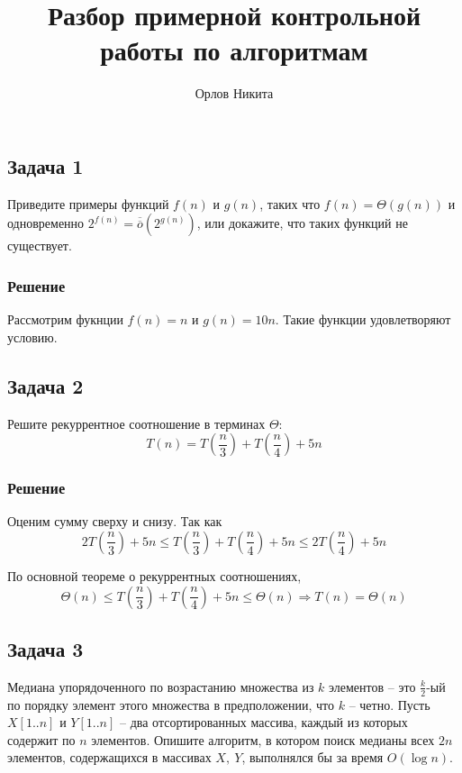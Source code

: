 \documentclass[a4letter,12pt]{article}
\newcommand{\doverline}[1]{\overline{\overline{#1}}}
\begin{document}
	\title{Разбор примерной контрольной работы по алгоритмам}
	\author{Орлов Никита}
	\maketitle
	
	\subsection*{Задача 1}	
	Приведите примеры функций $f(n)$ и $g(n)$, таких что $f(n) = \Theta(g(n))$ и одновременно $2^{f(n)} = \doverline{o}(2^{g(n)})$, или докажите, что таких функций не существует.
	
	\subsubsection*{Решение}
	Рассмотрим фукнции $f(n) = n$ и $g(n) = 10n$. Такие функции удовлетворяют условию.
	
	\subsection*{Задача 2}
	
	Решите рекуррентное соотношение в терминах $\Theta$:
	\[
	T(n) = T\left(\frac n3\right) + T\left(\frac n4\right) + 5n
	\]
	
	\subsubsection*{Решение}
	Оценим сумму сверху и снизу. Так как
	\[
	2T\left(\frac n3\right)+5n \leqslant  T\left(\frac n3\right) + T\left(\frac n4\right) + 5n \leqslant 2T\left(\frac n4\right) + 5n
	\]
	
	По основной теореме о рекуррентных соотношениях,
	\[
	\Theta(n) \leqslant T\left(\frac n3\right) + T\left(\frac n4\right) + 5n \leqslant \Theta(n) \Rightarrow T(n) = \Theta(n)
	\]
	\subsection*{Задача 3}
	Медиана упорядоченного по возрастанию множества из $k$ элементов -- это $\frac k2$-ый по порядку элемент этого множества в предположении, что $k$ -- четно. Пусть $X[1..n]$ и $Y[1..n]$ -- два отсортированных массива, каждый из которых содержит по $n$ элементов. Опишите алгоритм, в котором поиск медианы всех $2n$ элементов, содержащихся в массивах $X, \ Y$, выполнялся бы за время $O(\log n)$.
	
\end{document}
